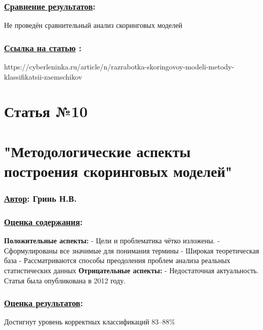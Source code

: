 \documentclass[a4paper,14pt]{article}
\begin{document}
\subsubsection*{\underline{Сравнение результатов}:}
Не проведён сравнительный анализ скоринговых моделей
\subsubsection*{\underline{Ссылка на статью} :}
https://cyberleninka.ru/article/n/razrabotka-skoringovoy-modeli-metody-klassifikatsii-zaemschikov


\newpage



\section*{Статья №10}
\section*{"Методологические аспекты построения скоринговых \newline моделей"}
\subsubsection*{\underline {Автор}: Гринь Н.В.}

\subsubsection*{\underline{Оценка содержания}:}
\textbf{Положительные аспекты:} \newline
- Цели и проблематика чётко изложены. \newline
- Сформулированы все значимые для понимания термины \newline
- Широкая теоретическая база \newline
- Рассматриваются способы преодоления проблем анализа реальных статистических данных \vspace{10pt} \newline
\textbf{Отрицательные аспекты:} \newline
- Недостаточная актуальность. Статья была опубликована в 2012 году.
\subsubsection*{\underline{Оценка результатов}:}
Достигнут уровень корректных классификаций 83–88\%
\end{document}
